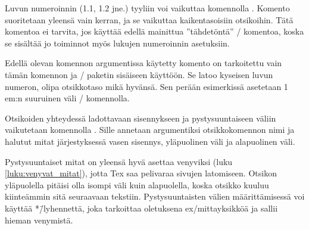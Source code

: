 Luvun numeroinnin (1.1, 1.2 jne.) tyyliin voi vaikuttaa komennolla
. Komento suoritetaan yleensä vain kerran, ja se
vaikuttaa kaikentasoisiin otsikoihin. Tätä komentoa ei tarvita, jos
käyttää edellä mainittua ''tähdetöntä'' \-/
komentoa, koska se sisältää jo toiminnot myös lukujen numeroinnin
asetuksiin.

\begin{koodilohkosis}
  \titlelabel{\thetitle\hspace{1em}}
\end{koodilohkosis}

Edellä olevan komennon argumentissa käytetty komento 
on tarkoitettu vain tämän komennon ja \-/ paketin
sisäiseen käyttöön. Se latoo kyseisen luvun numeron, olipa otsikkotaso
mikä hyvänsä. Sen perään esimerkissä asetetaan 1\,em:n suuruinen väli
\-/ komennolla.

Otsikoiden yhteydessä ladottavaan sisennykseen ja pystysuuntaiseen
väliin vaikutetaan komennolla . Sille annetaan
argumentiksi otsikkokomennon nimi ja halutut mitat järjestyksessä vasen
sisennys, yläpuolinen väli ja alapuolinen väli.

\begin{koodilohkosis}
\end{koodilohkosis}

Pystysuuntaiset mitat on yleensä hyvä asettaa venyviksi (luku
\ref{luku:venyvat_mitat}), jotta Tex saa pelivaraa sivujen latomiseen.
Otsikon yläpuolella pitäisi olla isompi väli kuin alapuolella, koska
otsikko kuuluu kiinteämmin sitä seuraavaan tekstiin. Pystysuuntaisten
välien määrittämisessä voi käyttää *\=/lyhennettä, joka tarkoittaa
oletuksena ex\-/mittayksikköä ja sallii hieman venymistä.

\begin{koodilohkosis}
\end{koodilohkosis}


